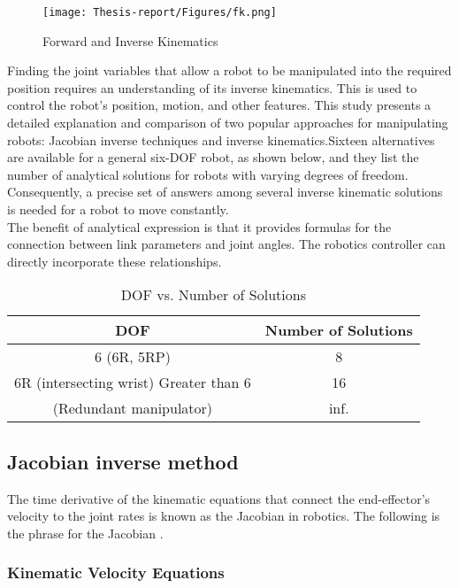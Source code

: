 \documentclass[12pt]{article}
\begin{document}
\begin{figure}[h]
    \centering
    \texttt{[image: Thesis-report/Figures/fk.png]}  
    \caption{Forward and Inverse Kinematics \cite{ref10}}
    \label{fig:inverse-kinematics}
\end{figure}

Finding the joint variables that allow a robot to be manipulated into the required position requires an understanding of its inverse kinematics. This is used to control the robot's position, motion, and other features. This study presents a detailed explanation and comparison of two popular approaches for manipulating robots: Jacobian inverse techniques and inverse kinematics.Sixteen alternatives are available for a general six-DOF robot, as shown below, and they list the number of analytical solutions for robots with varying degrees of freedom. Consequently, a precise set of answers among several inverse kinematic solutions is needed for a robot to move constantly\cite{ref10}.\\


The benefit of analytical expression is that it provides formulas for the connection between link parameters and joint angles. The robotics controller can directly incorporate these relationships\cite{ref10}.\\

\begin{table}[h]
    \centering
    \begin{tabular}{cc}
        \toprule
        \textbf{DOF} & \textbf{Number of Solutions} \\
        \midrule
        6 (6R, 5RP) & 8 \\
        6R (intersecting wrist)
Greater than 6 & 16\\
        (Redundant manipulator) & inf.\\
        \bottomrule
    \end{tabular}
    \caption{DOF vs. Number of Solutions \cite{ref19}}
    \label{tab:dof_solutions}
\end{table}
\subsection{Jacobian inverse method}
The time derivative of the kinematic equations that connect the end-effector's velocity to the joint rates is known as the Jacobian in robotics. The following is the phrase for the Jacobian \cite{ref19}.
\subsubsection{Kinematic Velocity Equations}
\end{document}
